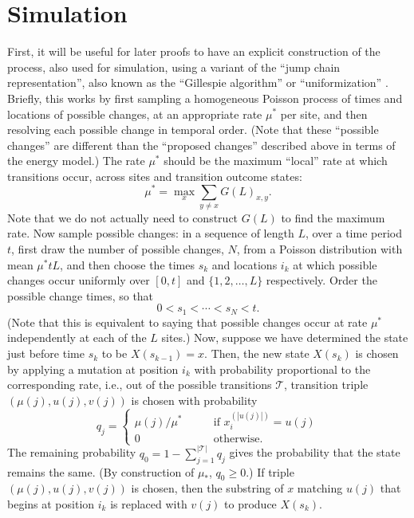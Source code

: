 \documentclass{article}
\newcommand{\calS}{\mathcal{S}}  %
\newcommand{\calT}{\mathcal{T}}  %
\newcommand{\st}{\colon}  %
\theoremstyle{plain}
\theoremstyle{definition}
\begin{document}
\section{Simulation}

First, it will be useful for later proofs to have an explicit construction of the process,
also used for simulation,
using a variant of the ``jump chain representation'', also known as the ``Gillespie algorithm''
or ``uniformization'' \citep{hobolth2009simulation}.
Briefly, this  works by first sampling a homogeneous Poisson process of times and locations of possible changes,
at an appropriate rate $\mu^*$ per site,
and then resolving each possible change in temporal order.
(Note that these ``possible changes'' are different than the ``proposed changes'' described above
in terms of the energy model.)
The rate $\mu^*$ should be the maximum ``local'' rate at which transitions occur, across sites and transition outcome states:
\[
    \mu^*
    = \max_x \sum_{y \neq x} G(L)_{x,y} .
\]
Note that we do not actually need to construct $G(L)$ to find the maximum rate.
Now sample possible changes:
in a sequence of length $L$, over a time period $t$,
first draw the number of possible changes, $N$,
from a Poisson distribution with mean $\mu^* t L$,
and then choose the times $s_k$ and locations $i_k$
at which possible changes occur uniformly
over $[0, t]$ and $\{1, 2, \ldots, L\}$ respectively.
Order the possible change times, so that
\[
    0 < s_1 < \cdots < s_N < t .
\]
(Note that this is equivalent to saying that possible
changes occur at rate $\mu^*$ independently at each of the $L$ sites.)
Now, suppose we have determined the state just before time $s_k$ to be $X(s_{k-1}) = x$.
Then, the new state $X(s_k)$ is chosen by applying a mutation at position $i_k$
with probability proportional to the corresponding rate, i.e.,
out of the possible transitions $\calT$, transition triple $(\mu(j), u(j), v(j))$ is chosen
with probability
\[
q_j = \begin{cases}
    \mu(j)/\mu^* \qquad & \text{if } x_i^{(|u(j)|)} = u(j)  \\
    0 \qquad & \text{otherwise.}
\end{cases}
\]
The remaining probability $q_0 = 1-\sum_{j=1}^{|\calT|} q_j$
gives the probability that the state remains the same.
(By construction of $\mu_*$, $q_0 \ge 0$.)
If triple $(\mu(j), u(j), v(j))$ is chosen, then
the substring of $x$ matching $u(j)$ that begins at position $i_k$
is replaced with $v(j)$ to produce $X(s_k)$.
\end{document}
